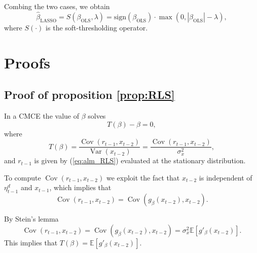 \documentclass[11pt]{article}
\begin{document}
Combing the two cases, we obtain 
\begin{equation}
\hat{\beta}_{\text{LASSO}} = S(\beta_{\text{OLS}}, \lambda) = \textrm{sign}(\beta_{\text{OLS}}) \cdot \max\left(0, |\beta_{\text{OLS}}| - \lambda\right),
\end{equation}
where $S(\cdot)$ is the soft-thresholding operator.


\section{Proofs}\label{sec:proofs}
\subsection{Proof of proposition \ref{prop:RLS}}\label{app:proof_RLS}

In a CMCE the value of $\beta$ solves
\begin{equation}
    T(\beta) - \beta = 0,
\end{equation}
where 
\begin{equation}
    T(\beta) = \frac{\operatorname{Cov}(r_{t-1}, x_{t-2})}{\operatorname{Var}(x_{t-2})} = \frac{\operatorname{Cov}(r_{t-1}, x_{t-2})}{\sigma^2_x},
\end{equation}
and $r_{t-1}$ is given by (\ref{eq:alm_RLS}) evaluated at the stationary distribution.

To compute $\operatorname{Cov}(r_{t-1}, x_{t-2})$ we exploit the fact that $x_{t-2}$ is independent of $\eta^d_{t-1}$ and $x_{t-1}$, which implies that
\begin{equation}
    \operatorname{Cov}(r_{t-1}, x_{t-2}) = \operatorname{Cov}\left(g_{\beta}(x_{t-2}), x_{t-2}\right).
\end{equation}

By Stein's lemma
\begin{equation}
    \operatorname{Cov}(r_{t-1}, x_{t-2}) = \operatorname{Cov}(g_{\beta}(x_{t-2}), x_{t-2}) = \sigma^2_x \mathbb{E}\left[g'_{\beta}(x_{t-2})\right].
\end{equation}
This implies that $T(\beta) = \mathbb{E}\left[g'_{\beta}(x_{t-2})\right]$.
\end{document}
